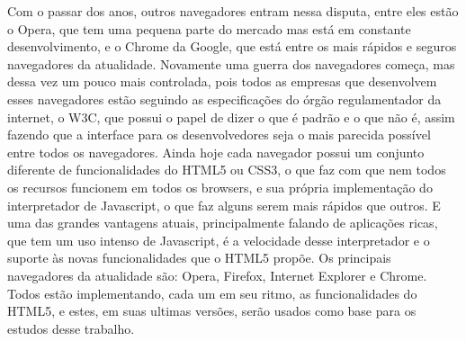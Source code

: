 Com o passar dos anos, outros navegadores entram nessa disputa, entre
eles estão o Opera, que tem uma pequena parte do mercado mas está em
constante desenvolvimento, e o Chrome da Google, que está entre os
mais rápidos e seguros navegadores da atualidade.
Novamente uma guerra dos navegadores começa, mas dessa vez um pouco
mais controlada, pois todos as empresas que desenvolvem esses
navegadores estão seguindo as especificações do órgão regulamentador da internet,
o W3C, que possui o papel de dizer o que é padrão e o que não é,
assim fazendo que a interface para os desenvolvedores seja o mais
parecida possível entre todos os navegadores.
Ainda hoje cada navegador possui um conjunto diferente de funcionalidades
do HTML5 ou CSS3, o que faz com que nem todos os recursos funcionem em todos
os browsers, e sua própria implementação do
interpretador de Javascript, o que faz alguns serem mais rápidos que
outros. E uma das grandes vantagens atuais, principalmente falando de
aplicações ricas, que tem um uso intenso de Javascript, é a velocidade
desse interpretador e o suporte às novas funcionalidades que o HTML5
propõe.
Os principais navegadores da atualidade são: Opera, Firefox, Internet
Explorer e Chrome. Todos estão implementando, cada um em seu ritmo, as
funcionalidades do HTML5, e estes, em suas ultimas versões, serão usados
como base para os estudos desse trabalho.
